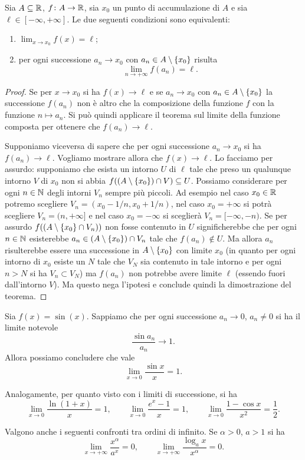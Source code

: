 \begin{theorem}
\mymark{***}
Sia $A \subseteq \mathbb R$, $f\colon A \to \mathbb R$, sia $x_0$ un punto di accumulazione di $A$ e sia
$\ell \in [-\infty, +\infty]$.
Le due seguenti condizioni sono equivalenti:
\begin{enumerate}
\item $\displaystyle \lim_{x\to x_0} f(x) = \ell$;
\item per ogni successione $a_n\to x_0$ con $a_n\in A\setminus{\left\{ x_0 \right\}}$ risulta
\[
\lim_{n\to+\infty} f(a_n) = \ell.
\]
\end{enumerate}
\end{theorem}
%
\begin{proof}
\mymark{***}
Se per $x\to x_0$ si ha $f(x)\to \ell$ e se $a_n \to x_0$ con $a_n\in A\setminus{\left\{ x_0 \right\}}$ la successione $f(a_n)$ non è altro che la composizione
della funzione $f$ con la funzione $n\mapsto a_n$. Si può quindi applicare
il teorema sul limite della funzione composta per ottenere che $f(a_n)\to \ell$.

Supponiamo viceversa di sapere che per ogni successione $a_n\to x_0$ si ha $f(a_n)\to \ell$. Vogliamo mostrare allora che $f(x)\to \ell$. Lo facciamo per assurdo: supponiamo che esista un intorno $U$ di $\ell$ tale che preso un qualunque intorno $V$ di $x_0$ non si abbia $f((A\setminus{\left\{ x_0 \right\}})\cap V)\subseteq U$.
Possiamo considerare per ogni $n\in \mathbb N$ degli intorni $V_n$ sempre più piccoli. Ad esempio nel caso $x_0 \in \mathbb R$ potremo scegliere $V_n = (x_0-1/n, x_0+1/n)$, nel caso $x_0 = +\infty$ si potrà scegliere $V_n = (n,+\infty]$ e nel caso $x_0=-\infty$ si sceglierà $V_n = [-\infty, -n)$.
Se per assurdo $f((A\setminus{\left\{ x_0 \right\}}\cap V_n))$ non fosse contenuto in $U$
significherebbe che per ogni $n\in\mathbb N$ esisterebbe $a_n \in (A\setminus{\left\{ x_0 \right\}})\cap V_n$ tale che $f(a_n)\not \in U$. Ma allora $a_n$ risulterebbe essere una successione in
$A\setminus {\left\{ x_0 \right\}}$ con limite $x_0$
(in quanto per ogni intorno di $x_0$ esiste un $N$ tale che $V_N$ sia contenuto in tale intorno e per ogni $n>N$ si ha $V_n\subset V_N$)
ma $f(a_n)$ non potrebbe avere limite $\ell$
(essendo fuori dall'intorno $V$).
Ma questo nega l'ipotesi e conclude quindi la dimostrazione del teorema.
\end{proof}

\begin{example}
Sia $f(x) = \sin(x)$. Sappiamo che per ogni successione $a_n\to 0$, $a_n\neq 0$ si ha il limite notevole
\[
  \frac{\sin a_n}{a_n} \to 1.
\]
Allora possiamo concludere che vale
\[
  \lim_{x\to 0} \frac{\sin x}{x} = 1.
\]

Analogamente, per quanto visto con i limiti di successione,
si ha
\[
  \lim_{x\to 0}\frac{\ln(1+x)}{x} = 1,
  \qquad
  \lim_{x\to 0}\frac{e^x-1}{x} = 1,
  \qquad
  \lim_{x\to 0}\frac{1-\cos x}{x^2} = \frac 1 2.
\]

Valgono anche i seguenti confronti tra ordini di infinito.
Se $\alpha>0$, $a>1$ si ha
\[
  \lim_{x\to +\infty}\frac{x^\alpha}{a^x} = 0,
  \qquad
  \lim_{x\to +\infty}\frac{\log_a x}{x^\alpha} = 0.
\]
\end{example}

